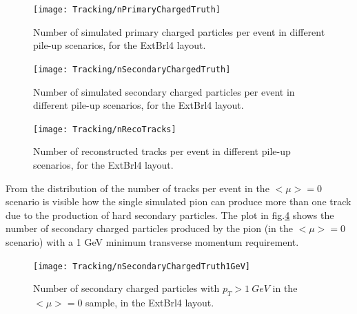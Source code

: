 \documentclass[a4paper,twoside,12pt]{article}
\begin{document}
\begin{figure}
\centering
\texttt{[image: Tracking/nPrimaryChargedTruth]}
\caption{Number of simulated primary charged particles per event in different pile-up scenarios, for the ExtBrl4 layout.}
\label{fig:tracking:nPrimaryChargedTruth}
\end{figure}

\begin{figure}
\centering
\texttt{[image: Tracking/nSecondaryChargedTruth]}
\caption{Number of simulated secondary charged particles per event in different pile-up scenarios, for the ExtBrl4 layout.}
\label{fig:tracking:nSecondaryChargedTruth}
\end{figure}


\begin{figure}
\centering
\texttt{[image: Tracking/nRecoTracks]}
\caption{Number of reconstructed tracks per event in different pile-up scenarios, for the ExtBrl4 layout.}
\label{fig:tracking:nRecoTracks}
\end{figure}

From the distribution of the number of tracks per event in the $<\mu> = 0$ scenario is visible
how the single simulated pion can produce more than one track due to the production of hard secondary particles. The plot in fig.\ref{fig:tracking:nSecondaryChargedTruth1GeV} shows the number of secondary charged particles produced by the pion (in the $<\mu> = 0$ scenario)
with a 1 GeV minimum transverse momentum requirement. \\

\begin{figure}
\centering
\texttt{[image: Tracking/nSecondaryChargedTruth1GeV]}
\caption{Number of secondary charged particles with $p_T > 1\ GeV$ in the $<\mu> = 0$ sample, in the ExtBrl4 layout.}
\label{fig:tracking:nSecondaryChargedTruth1GeV}
\end{figure}
\end{document}
